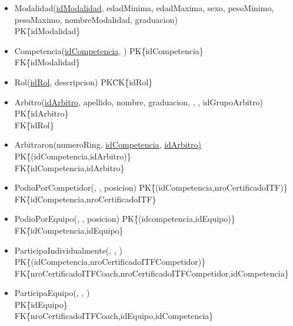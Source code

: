 \begin{itemize}
\item{Modalidad(\underline{idModalidad}, edadMinima, edadMaxima, sexo, pesoMinimo, pesoMaximo, nombreModalidad, graduacion) \\
PK\=\{idModalidad\}
}

\item{Competencia(\underline{idCompetencia}, )
PK\=\{idCompetencia\}\\
FK\=\{idModalidad\}
}

\item{Rol(\underline{idRol}, descripcion)
PK\=CK\=\{idRol\}
}

\item{Arbitro(\underline{idArbitro}, apellido, nombre, graduacion, , , idGrupoArbitro)\\
PK\=\{idArbitro\}\\
FK\=\{idRol\}
}

\item{Arbitraron(numeroRing, \underline{idCompetencia}, \underline{idArbitro)}
PK\= \{(idCompetencia,idArbitro)\}\\
FK\=\{idCompetencia,idArbitro\}
}

\item{PodioPorCompetidor(\underline{}, \underline{}, posicion)
PK\= \{(idCompetencia,nroCertificadoITF)\}\\
FK\=\{idCompetencia,nroCertificadoITF\}
}

\item{PodioPorEquipo(\underline{}, \underline{}, posicion)
PK\= \{(idcompetencia,idEquipo)\}\\
FK\=\{idCompetencia,idEquipo\}
}

\item{ParticipaIndividualmente(\underline{}, \underline{}, )\\
PK\= \{(idCompetencia,nroCertificadoITFCompetidor)\}\\
FK\=\{nroCertificadoITFCoach,nroCertificadoITFCompetidor,idCompetencia\}
}

\item{ParticipaEquipo(, , \underline{})\\
PK\= \{idEquipo\}\\
FK\=\{nroCertificadoITFCoach,idEquipo,idCompetencia\}
}

\end{itemize}

